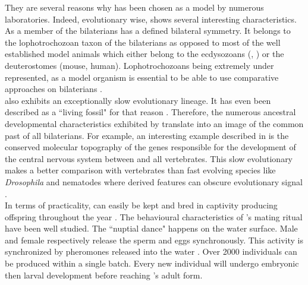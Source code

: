      They are several reasons why \platy{} has been chosen as a model by numerous laboratories. Indeed, evolutionary wise, \platy{} shows several interesting characteristics.  As a member of the bilaterians \platy{} has a defined bilateral symmetry. It belongs to the lophotrochozoan taxon of the bilaterians as opposed to most of the well established model animals which either belong to the ecdysozoans (, ) or the deuterostomes (mouse, human). Lophotrochozoans being extremely under represented, \platy{} as a model organism is essential to be able to use comparative approaches on bilaterians \cite{Fischer10}.\\
     
     \platy{} also exhibits an exceptionally slow evolutionary lineage. It has even been described as a ``living fossil" for that reason \cite{Fischer10}. Therefore, the numerous ancestral developmental characteristics exhibited by \platy{} translate into an image of the common past of all bilaterians. For example, an interesting example described in \cite{denes07,tessmar07} is the conserved molecular topography of the genes responsible for the development of the central nervous system between \platy{} and all vertebrates. This slow evolutionary makes \platy{} a better comparison with vertebrates than fast evolving species like \emph{Drosophila} and nematodes where derived features can obscure evolutionary signal \cite{Fischer10,arendt124}.\\
     
     In terms of practicality, \platy{} can easily be kept and bred in captivity producing offspring throughout the year \cite{fischer04}. The behavioural characteristics of \platy{}'s mating ritual have been well studied. The ``nuptial dance" happens on the water surface. Male and female respectively release the sperm and eggs synchronously. This activity is synchronized by pheromones released into the water \cite{zeeck98}. Over 2000 individuals can be produced within a single batch. Every new individual will undergo embryonic then larval development before reaching \platy{}'s adult form.\\

 
